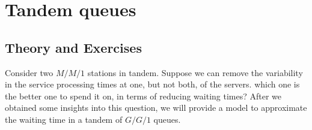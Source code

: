 
\section{Tandem queues}
\label{sec:tandem-queues}


\subsection*{Theory and Exercises}



Consider two $M/M/1$ stations in tandem. Suppose we can remove the variability in the service processing times at one, but not both, of the servers. which one is the better one to spend it on, in terms of reducing waiting times?  After we obtained some insights into this question, we will provide a model to approximate the waiting time in a tandem of $G/G/1$ queues.

